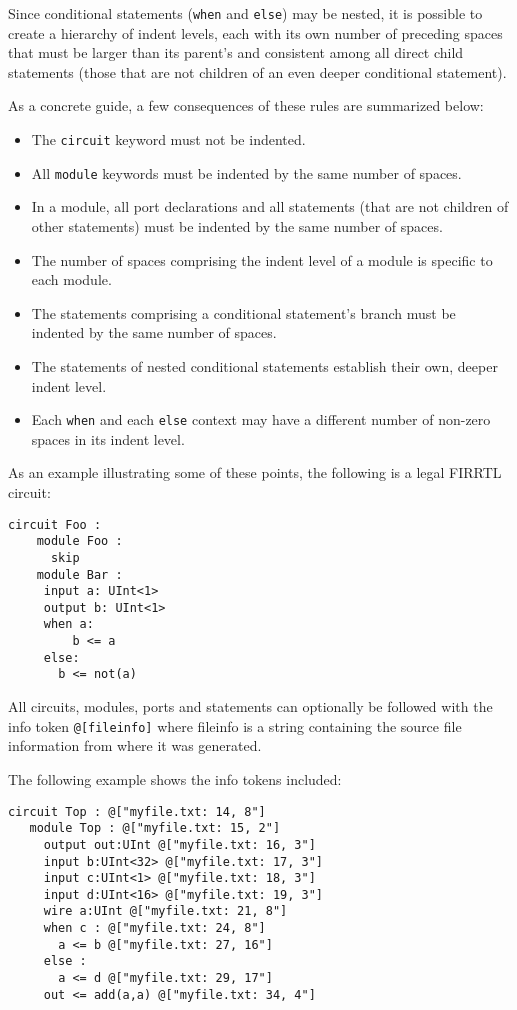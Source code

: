 \documentclass[12pt]{article}
\begin{document}
Since conditional statements (\verb|when| and \verb|else|) may be nested, it is possible to create a hierarchy of indent levels, each with its own number of preceding spaces that must be larger than its parent’s and consistent among all direct child statements (those that are not children of an even deeper conditional statement).

As a concrete guide, a few consequences of these rules are summarized below:

\begin{itemize}
\item The \verb|circuit| keyword must not be indented.
\item All \verb|module| keywords must be indented by the same number of spaces.
\item In a module, all port declarations and all statements (that are not children of other statements) must be indented by the same number of spaces.
\item The number of spaces comprising the indent level of a module is specific to each module.
\item The statements comprising a conditional statement's branch must be indented by the same number of spaces.
\item The statements of nested conditional statements establish their own, deeper indent level.
\item Each \verb|when| and each \verb|else| context may have a different number of non-zero spaces in its indent level.
\end{itemize}

As an example illustrating some of these points, the following is a legal FIRRTL circuit:

\begin{lstlisting}
circuit Foo :
    module Foo :
      skip
    module Bar :
     input a: UInt<1>
     output b: UInt<1>
     when a:
         b <= a
     else:
       b <= not(a)
\end{lstlisting}

All circuits, modules, ports and statements can optionally be followed with the info token \verb|@[fileinfo]| where fileinfo is a string containing the source file information from where it was generated.

The following example shows the info tokens included:

\begin{lstlisting}
circuit Top : @["myfile.txt: 14, 8"]
   module Top : @["myfile.txt: 15, 2"]
     output out:UInt @["myfile.txt: 16, 3"]
     input b:UInt<32> @["myfile.txt: 17, 3"]
     input c:UInt<1> @["myfile.txt: 18, 3"]
     input d:UInt<16> @["myfile.txt: 19, 3"]
     wire a:UInt @["myfile.txt: 21, 8"]
     when c : @["myfile.txt: 24, 8"]
       a <= b @["myfile.txt: 27, 16"]
     else :
       a <= d @["myfile.txt: 29, 17"]
     out <= add(a,a) @["myfile.txt: 34, 4"]
\end{lstlisting}
\end{document}
